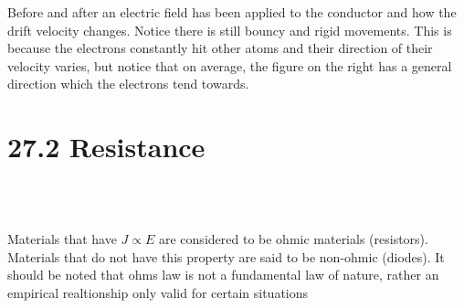 \documentclass[12pt, titlepage, oneside]{article}
\begin{document}
Before and after an electric field has been applied to the conductor and how the drift velocity changes. Notice there is still bouncy and rigid movements. This is because the electrons constantly hit other atoms and their direction of their velocity varies, but notice that on average, the figure on the right has a general direction which the electrons tend towards.
\section*{27.2 Resistance}
\noindent{}
\\
\vspace{10pt}

\noindent{} 
\\

Materials that have $J \propto E$ are considered to be ohmic materials (resistors). Materials that do not have this property are said to be non-ohmic (diodes). It should be noted that ohms law is not a fundamental law of nature, rather an empirical realtionship only valid for certain situations
\newpage 
\end{document}
